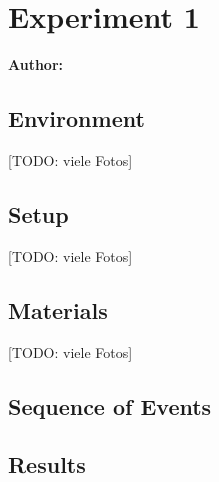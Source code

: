 \chapter{Experiment 1}

\textbf{Author: } 

\section{Environment}
[TODO: viele Fotos]

\section{Setup}
[TODO: viele Fotos]

\section{Materials}
[TODO: viele Fotos]

\section{Sequence of Events}

\section{Results}

\filbreak